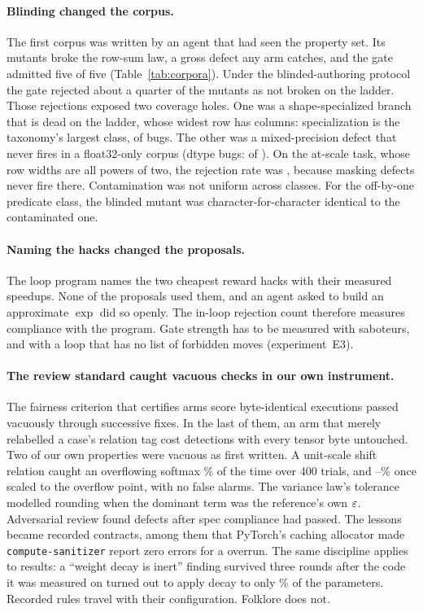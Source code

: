 \paragraph{Blinding changed the corpus.}
The first corpus was written by an agent that had seen the property set. Its mutants
broke the row-sum law, a gross defect any arm catches, and the gate admitted five of
five (Table~\ref{tab:corpora}). Under the blinded-authoring protocol the gate
rejected about a quarter of the mutants as not broken on the ladder. Those rejections
exposed two coverage holes. One was a shape-specialized branch that is dead on the ladder,
whose widest row has \ladderWidestRow{} columns: specialization is the taxonomy's
largest class, \isstaSpecialization{} of \isstaBugs{} bugs. The other was a
mixed-precision defect that never fires in a float32-only corpus (dtype bugs:
\isstaDtype{} of \isstaBugs{}). On the at-scale task, whose row widths are all powers of
two, the rejection rate was \grownRejectionScale, because masking defects never fire there. Contamination was not
uniform across classes. For the off-by-one predicate class, the blinded mutant was
character-for-character identical to the contaminated one.

\paragraph{Naming the hacks changed the proposals.}
The loop program names the two cheapest reward hacks with their measured speedups. None
of the \loopCandidates{} proposals used them, and an agent asked to build an
approximate $\exp$ did so openly. The in-loop rejection count therefore measures
compliance with the program. Gate strength has to be measured with saboteurs, and with a
loop that has no list of forbidden moves (experiment~E3).

\paragraph{The review standard caught vacuous checks in our own instrument.}
The fairness criterion that certifies arms score byte-identical executions passed
vacuously through \fairnessLayers{} successive fixes. In the last of them, an arm that
merely relabelled a case's relation tag cost \relabelLoss{} detections with every tensor
byte untouched. Two of our own properties were vacuous as first written. A unit-scale
shift relation caught an overflowing softmax \shiftUnitCatch\% of the time over 400
trials, and \shiftScaledCatchLo--\shiftScaledCatchHi\% once scaled to the overflow point,
with no false alarms. The variance law's tolerance modelled rounding when the dominant
term was the reference's own $\varepsilon$. Adversarial review found \reviewDefects{} defects
after spec compliance had passed. The lessons became recorded contracts, among them that
PyTorch's caching allocator made \texttt{compute-sanitizer} report zero errors for a
\sanitizerOverrun{} overrun. The same discipline applies to results: a
``weight decay is inert'' finding survived three rounds after the code it was measured on
turned out to apply decay to only \wdCoverage\% of the parameters. Recorded rules travel
with their configuration. Folklore does not.
